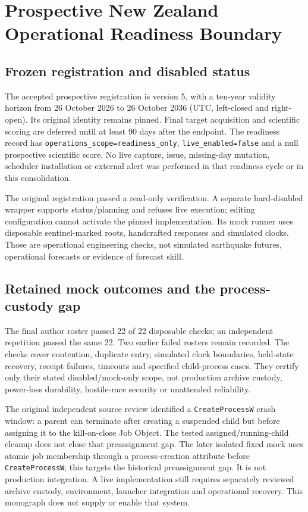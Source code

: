 \chapter{Prospective New Zealand Operational Readiness Boundary}\label{app:prospective}

\section{Frozen registration and disabled status}

The accepted prospective registration is version 5, with a ten-year validity horizon from 26 October 2026 to 26 October 2036 (UTC, left-closed and right-open). Its original identity remains pinned. Final target acquisition and scientific scoring are deferred until at least 90 days after the endpoint. The readiness record has \texttt{operations\_scope=readiness\_only}, \texttt{live\_enabled=false} and a null prospective scientific score. No live capture, issue, missing-day mutation, scheduler installation or external alert was performed in that readiness cycle or in this consolidation.

The original registration passed a read-only verification. A separate hard-disabled wrapper supports status/planning and refuses live execution; editing configuration cannot activate the pinned implementation. Its mock runner uses disposable sentinel-marked roots, handcrafted responses and simulated clocks. Those are operational engineering checks, not simulated earthquake futures, operational forecasts or evidence of forecast skill.

\section{Retained mock outcomes and the process-custody gap}

The final author roster passed 22 of 22 disposable checks; an independent repetition passed the same 22. Two earlier failed rosters remain recorded. The checks cover contention, duplicate entry, simulated clock boundaries, held-state recovery, receipt failures, timeouts and specified child-process cases. They certify only their stated disabled/mock-only scope, not production archive custody, power-loss durability, hostile-race security or unattended reliability.

The original independent source review identified a \texttt{CreateProcessW} crash window: a parent can terminate after creating a suspended child but before assigning it to the kill-on-close Job Object. The tested assigned/running-child cleanup does not close that preassignment gap. The later isolated fixed mock uses atomic job membership through a process-creation attribute before \texttt{CreateProcessW}; this targets the historical preassignment gap. It is not production integration. A live implementation still requires separately reviewed archive custody, environment, launcher integration and operational recovery. This monograph does not supply or enable that system.

